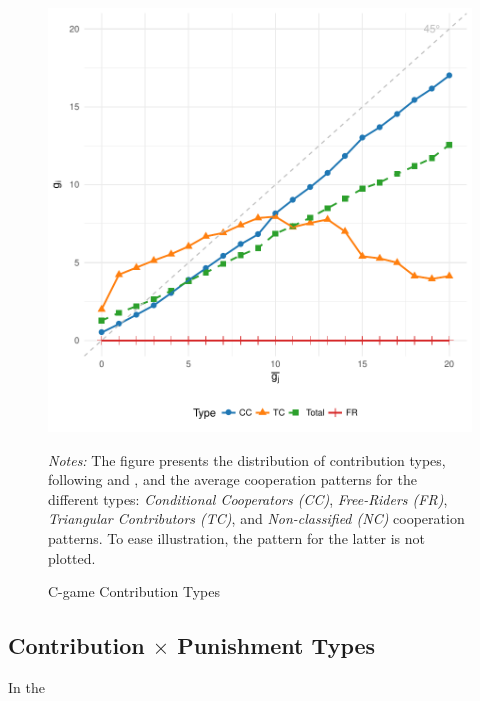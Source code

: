 \documentclass[11pt,a4paper]{article}
\begin{document}
\begin{refsection}
\begin{figure}[tbp]
  \caption{C-game Contribution Types}
  \centering
  \includegraphics[width=.5\linewidth,clip,viewport={0 30 430 450}]{img/51_type}
  \label{fig:cctypes}
    \parbox{.95\textwidth}{\footnotesize\textit{Notes:} The figure presents the distribution of contribution types, following \cite{Fischbacher2001} and \cite{Fischbacher2010}, and the average cooperation patterns for the different types: \textit{Conditional Cooperators (CC)}, \textit{Free-Riders (FR)}, \textit{Triangular Contributors (TC)}, and \textit{Non-classified (NC)} cooperation patterns. To ease illustration, the pattern for the latter is not plotted.}
\end{figure}

\subsection{Contribution $\times$ Punishment Types}

In the 


\end{refsection}
\end{document}
